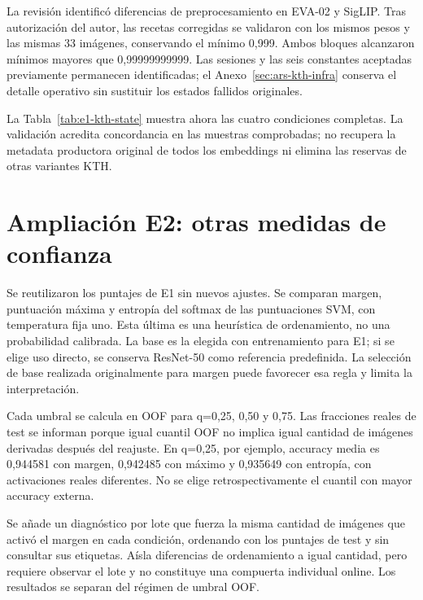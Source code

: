 La revisión identificó diferencias de preprocesamiento en EVA-02 y SigLIP. Tras autorización del autor, las recetas corregidas se validaron con los mismos pesos y las mismas 33 imágenes, conservando el mínimo 0,999. Ambos bloques alcanzaron mínimos mayores que 0,99999999999. Las sesiones y las seis constantes aceptadas previamente permanecen identificadas; el Anexo~\ref{sec:ars-kth-infra} conserva el detalle operativo sin sustituir los estados fallidos originales.

La Tabla~\ref{tab:e1-kth-state} muestra ahora las cuatro condiciones completas. La validación acredita concordancia en las muestras comprobadas; no recupera la metadata productora original de todos los embeddings ni elimina las reservas de otras variantes KTH.



\section{Ampliación E2: otras medidas de confianza}\label{sec:e2-confidence}
Se reutilizaron los puntajes de E1 sin nuevos ajustes. Se comparan margen, puntuación máxima y entropía del softmax de las puntuaciones SVM, con temperatura fija uno. Esta última es una heurística de ordenamiento, no una probabilidad calibrada. La base es la elegida con entrenamiento para E1; si se elige uso directo, se conserva ResNet-50 como referencia predefinida. La selección de base realizada originalmente para margen puede favorecer esa regla y limita la interpretación.

Cada umbral se calcula en OOF para q=0,25, 0,50 y 0,75. Las fracciones reales de test se informan porque igual cuantil OOF no implica igual cantidad de imágenes derivadas después del reajuste. En q=0,25, por ejemplo, accuracy media es 0,944581 con margen, 0,942485 con máximo y 0,935649 con entropía, con activaciones reales diferentes. No se elige retrospectivamente el cuantil con mayor accuracy externa.



Se añade un diagnóstico por lote que fuerza la misma cantidad de imágenes que activó el margen en cada condición, ordenando con los puntajes de test y sin consultar sus etiquetas. Aísla diferencias de ordenamiento a igual cantidad, pero requiere observar el lote y no constituye una compuerta individual online. Los resultados se separan del régimen de umbral OOF.

